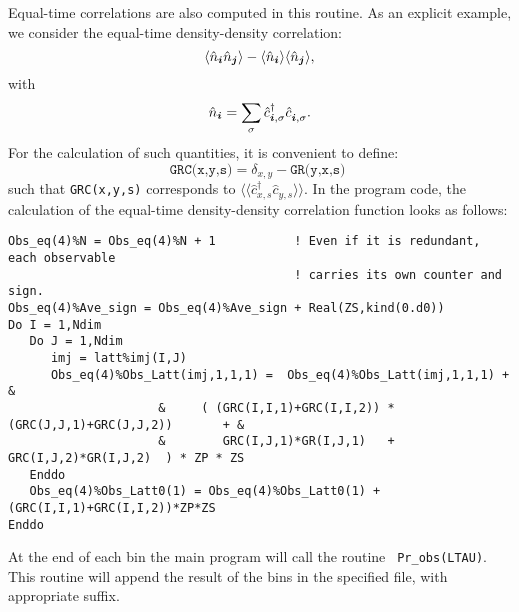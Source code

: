 Equal-time correlations  are also computed in this routine. As an explicit example, we  consider the equal-time density-density correlation:
\begin{equation}
	 \langle \hat{n}_{\boldsymbol{i}}   \hat{n}_{\boldsymbol{j}} \rangle   -  \langle \hat{n}_{\boldsymbol{i} }\rangle  \langle    \hat{n}_{\boldsymbol{j}}  \rangle,
\end{equation} 
with
\begin{equation}
	 \hat{n}_{\vec{i}}  =   \sum_{\sigma} \hat{c}^{\dagger}_{\ve{i},\sigma} \hat{c}^{\phantom\dagger}_{\ve{i},\sigma}.
\end{equation}
For the calculation of such quantities, it is convenient to  define: 
\begin{equation}
\label{GRC.eq}
	\texttt{GRC(x,y,s)}   =  \delta_{x,y}  - \texttt{GR(y,x,s)  }
\end{equation}
such that \texttt{GRC(x,y,s)}    corresponds to  $ \langle \langle  \hat{c}_{x,s}^{\dagger}\hat{c}_{y,s}^{\phantom\dagger} \rangle \rangle $. 
In the program code, the calculation of the equal-time density-density correlation function looks as follows:
\begin{lstlisting}[style=fortran]
Obs_eq(4)%N = Obs_eq(4)%N + 1           ! Even if it is redundant, each observable  
                                        ! carries its own counter and sign.
Obs_eq(4)%Ave_sign = Obs_eq(4)%Ave_sign + Real(ZS,kind(0.d0))  
Do I = 1,Ndim
   Do J = 1,Ndim                       
      imj = latt%imj(I,J)
      Obs_eq(4)%Obs_Latt(imj,1,1,1) =  Obs_eq(4)%Obs_Latt(imj,1,1,1) + &
                     &     ( (GRC(I,I,1)+GRC(I,I,2)) * (GRC(J,J,1)+GRC(J,J,2))       + &
                     &        GRC(I,J,1)*GR(I,J,1)   +  GRC(I,J,2)*GR(I,J,2)  ) * ZP * ZS 
   Enddo
   Obs_eq(4)%Obs_Latt0(1) = Obs_eq(4)%Obs_Latt0(1) + (GRC(I,I,1)+GRC(I,I,2))*ZP*ZS
Enddo
\end{lstlisting} 
At the end of each bin  the main program will call the routine \texttt{ Pr\_obs(LTAU)}. This routine will append the result of the bins in the specified file,  with appropriate suffix. 

